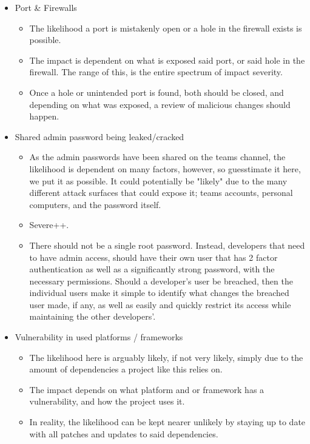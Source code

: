 \documentclass{article}
\begin{document}
\begin{itemize}
\begin{itemize}
    \end{itemize}
    \item Port & Firewalls
    \begin{itemize}
        \item The likelihood a port is mistakenly open or a hole in the firewall exists is possible.
        \item The impact is dependent on what is exposed said port, or said hole in the firewall. The range of this, is the entire spectrum of impact severity.
        \item Once a hole or unintended port is found, both should be closed, and depending on what was exposed, a review of malicious changes should happen.
    \end{itemize}
    \item Shared admin password being leaked/cracked
    \begin{itemize}
        \item As the admin passwords have been shared on the teams channel, the likelihood is dependent on many factors, however, so guesstimate it here, we put it as possible. It could potentially be "likely" due to the many different attack surfaces that could expose it; teams accounts, personal computers, and the password itself.
        \item Severe++.
        \item There should not be a single root password. Instead, developers that need to have admin access, should have their own user that has 2 factor authentication as well as a significantly strong password, with the necessary permissions. Should a developer's user be breached, then the individual users make it simple to identify what changes the breached user made, if any, as well as easily and quickly restrict its access while maintaining the other developers'.
    \end{itemize}
    \item Vulnerability in used platforms / frameworks
    \begin{itemize}
        \item The likelihood here is arguably likely, if not very likely, simply due to the amount of dependencies a project like this relies on.
        \item The impact depends on what platform and or framework has a vulnerability, and how the project uses it.
        \item In reality, the likelihood can be kept nearer unlikely by staying up to date with all patches and updates to said dependencies.

\end{itemize}
\end{itemize}
\end{document}
